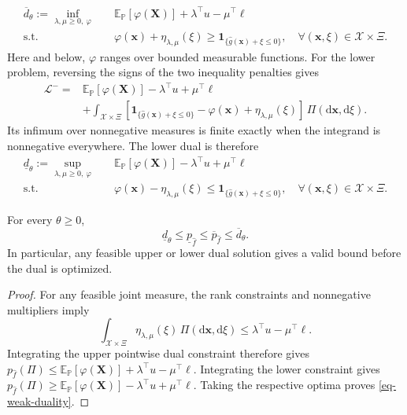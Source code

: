 \begin{equation}
  \begin{aligned}
    \overline d_\theta:=\inf_{\lambda,\mu\ge0,\ \varphi}\quad&
    \mathbb E_{\mathbb P}\left[\varphi(\bm X)\right]+\lambda^\top u-\mu^\top\ell\\
    \text{s.t.}\quad&
    \varphi(\bm x)+\eta_{\lambda,\mu}(\xi)\ge\mathbf1_{\{\hat g(\bm x)+\xi\le0\}},
    \quad\forall(\bm x,\xi)\in\mathcal X\times\Xi.
  \end{aligned}
  \label{eq-upper-measure-dual}
\end{equation}
Here and below, $\varphi$ ranges over bounded measurable functions. For the lower problem, reversing the signs of the two inequality penalties gives
\begin{equation}
  \begin{aligned}
    \mathcal L^-={}&\mathbb E_{\mathbb P}\left[\varphi(\bm X)\right]-\lambda^\top u+\mu^\top\ell\\
    &+\int_{\mathcal X\times\Xi}\left[\mathbf1_{\{\hat g(\bm x)+\xi\le0\}}-\varphi(\bm x)+\eta_{\lambda,\mu}(\xi)\right]\,\Pi\left(\mathrm d\bm x,\mathrm d\xi\right).
  \end{aligned}
  \label{eq-lower-lagrangian}
\end{equation}
Its infimum over nonnegative measures is finite exactly when the integrand is nonnegative everywhere. The lower dual is therefore
\begin{equation}
  \begin{aligned}
    \underline d_\theta:=\sup_{\lambda,\mu\ge0,\ \varphi}\quad&
    \mathbb E_{\mathbb P}\left[\varphi(\bm X)\right]-\lambda^\top u+\mu^\top\ell\\
    \text{s.t.}\quad&
    \varphi(\bm x)-\eta_{\lambda,\mu}(\xi)\le\mathbf1_{\{\hat g(\bm x)+\xi\le0\}},
    \quad\forall(\bm x,\xi)\in\mathcal X\times\Xi.
  \end{aligned}
  \label{eq-lower-measure-dual}
\end{equation}

\begin{lemma}
  \label{lem-weak-duality}
  For every $\theta\ge0$,
  \begin{equation}
    \underline d_\theta\le\underline p_{\hat f}\le\overline p_{\hat f}\le\overline d_\theta.
    \label{eq-weak-duality}
  \end{equation}
  In particular, any feasible upper or lower dual solution gives a valid bound before the dual is optimized.
\end{lemma}
\begin{proof}
  For any feasible joint measure, the rank constraints and nonnegative multipliers imply
  \[
    \int_{\mathcal X\times\Xi}\eta_{\lambda,\mu}(\xi)\,\Pi\left(\mathrm d\bm x,\mathrm d\xi\right)
    \le\lambda^\top u-\mu^\top\ell.
  \]
  Integrating the upper pointwise dual constraint therefore gives
  $p_{\hat f}(\Pi)\le\mathbb E_{\mathbb P}[\varphi(\bm X)]+\lambda^\top u-\mu^\top\ell$.
  Integrating the lower constraint gives
  $p_{\hat f}(\Pi)\ge\mathbb E_{\mathbb P}[\varphi(\bm X)]-\lambda^\top u+\mu^\top\ell$.
  Taking the respective optima proves \eqref{eq-weak-duality}.
\end{proof}

